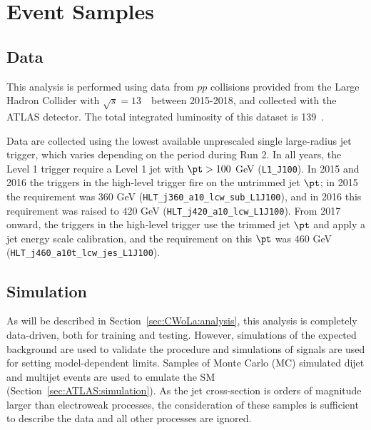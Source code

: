\section{Event Samples}
\label{sec:CWoLa:eventsamples}


\subsection{Data}
\label{sec:CWoLa:data}

This analysis is performed using data from $pp$ collisions provided from the Large Hadron Collider with $\sqrt{s} = 13$~\TeV~between 2015-2018, and collected with the ATLAS detector. The total integrated luminosity of this dataset is 139~\ifb.

Data are collected using the lowest available unprescaled single large-radius jet trigger, which varies depending on the period during Run 2.
In all years, the Level 1 trigger require a Level 1 jet with $\pt>100$ GeV (\texttt{L1\_J100}).
In 2015 and 2016 the triggers in the high-level trigger fire on the untrimmed jet $\pt$; in 2015 the requirement was $360$ GeV (\texttt{HLT\_j360\_a10\_lcw\_sub\_L1J100}), and in 2016 this requirement was raised to $420$ GeV (\texttt{HLT\_j420\_a10\_lcw\_L1J100}).
From 2017 onward, the triggers in the high-level trigger use the trimmed jet $\pt$ and apply a jet energy scale calibration, and the requirement on this $\pt$ was $460$ GeV (\texttt{HLT\_j460\_a10t\_lcw\_jes\_L1J100}).

\subsection{Simulation}

As will be described in Section~\ref{sec:CWoLa:analysis}, this analysis is completely data-driven, both for training and testing.
However, simulations of the expected background are used to validate the procedure and simulations of signals are used for setting model-dependent limits.
Samples of Monte Carlo (MC) simulated dijet and multijet events are used to emulate the SM (Section~\ref{sec:ATLAS:simulation}).
As the jet cross-section is orders of magnitude larger than electroweak processes, the consideration of these samples is sufficient to describe the data and all other processes are ignored.  

